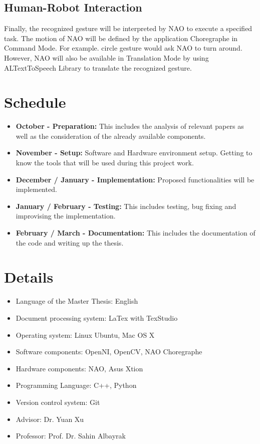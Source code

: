 \section{Human-Robot Interaction}
Finally, the recognized gesture will be interpreted by NAO to execute a specified task. The motion of NAO will be defined by the application Choregraphe in Command Mode. For example. circle gesture would ask NAO to turn around. However, NAO will also be available in Translation Mode by using ALTextToSpeech Library to translate the recognized gesture.


\chapter{Schedule}
\begin{itemize}
	\item \textbf{October - Preparation:} This includes the analysis of relevant papers as well as the consideration of the already available components.
	\item \textbf{November - Setup:} Software and Hardware environment setup. Getting to know the tools that will be used during this project work.
	\item \textbf{December / January - Implementation:} Proposed functionalities will be implemented.
	\item \textbf{January / February - Testing:} This includes testing, bug fixing and improvising the implementation.
	\item \textbf{February / March - Documentation:} This includes the documentation of the code and writing up the thesis.
\end{itemize}

\chapter{Details}
\begin{itemize}
	\item Language of the Master Thesis: English
	\item Document processing system: LaTex with TexStudio
	\item Operating system: Linux Ubuntu, Mac OS X
	\item Software components: OpenNI, OpenCV, NAO Choregraphe
	\item Hardware components: NAO, Asus Xtion
	\item Programming Language: C++, Python
	\item Version control system: Git
	\item Advisor: Dr. Yuan Xu
	\item Professor: Prof. Dr. Sahin Albayrak
\end{itemize}
